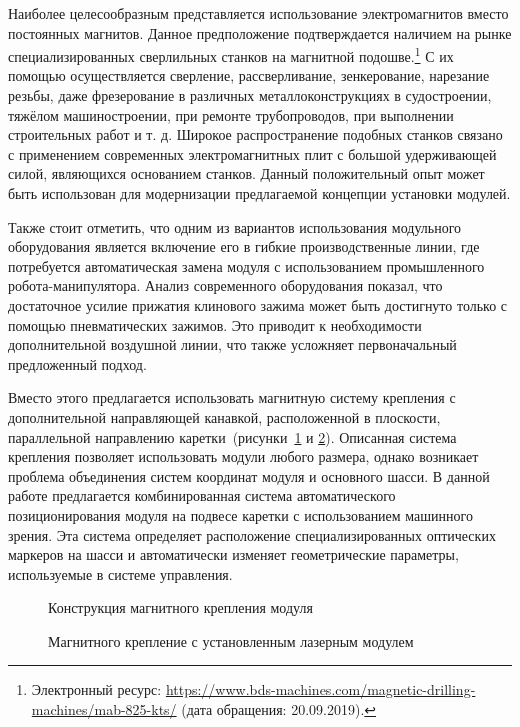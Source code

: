 Наиболее целесообразным представляется использование электромагнитов вместо постоянных магнитов. Данное предположение подтверждается наличием на рынке специализированных сверлильных станков на магнитной подошве.\footnote{Электронный ресурс: {\tiny\url{https://www.bds-machines.com/magnetic-drilling-machines/mab-825-kts/}} (дата обращения: 20.09.2019).} С их помощью осуществляется сверление, рассверливание, зенкерование, нарезание резьбы, даже фрезерование в различных металлоконструкциях в судостроении, тяжёлом машиностроении, при ремонте трубопроводов, при выполнении строительных работ и т. д. Широкое распространение подобных станков связано с применением современных электромагнитных плит с большой удерживающей силой, являющихся основанием станков. Данный положительный опыт может быть использован для модернизации предлагаемой концепции установки модулей.

Также стоит отметить, что одним из вариантов использования модульного оборудования является включение его в гибкие производственные линии, где потребуется автоматическая замена модуля с использованием промышленного робота-манипулятора. Анализ современного оборудования показал, что достаточное усилие прижатия клинового зажима может быть достигнуто только с помощью пневматических зажимов. Это приводит к необходимости дополнительной воздушной линии, что также усложняет первоначальный предложенный подход.

Вместо этого предлагается использовать магнитную систему крепления с дополнительной направляющей канавкой, расположенной в плоскости, параллельной направлению каретки~(рисунки~\cref{fig:quick-mount} и \cref{fig:quick-mount-1}). Описанная система крепления позволяет использовать модули любого размера, однако возникает проблема объединения систем координат модуля и основного шасси. В данной работе предлагается комбинированная система автоматического позиционирования модуля на подвесе каретки с использованием машинного зрения. Эта система определяет расположение специализированных оптических маркеров на шасси и автоматически изменяет геометрические параметры, используемые в системе управления.

\begin{figure}[ht]
	\caption{Конструкция магнитного крепления модуля}\label{fig:quick-mount}
\end{figure}

\begin{figure}[ht]
	\caption{Магнитного крепление с установленным лазерным модулем}\label{fig:quick-mount-1}
\end{figure}

